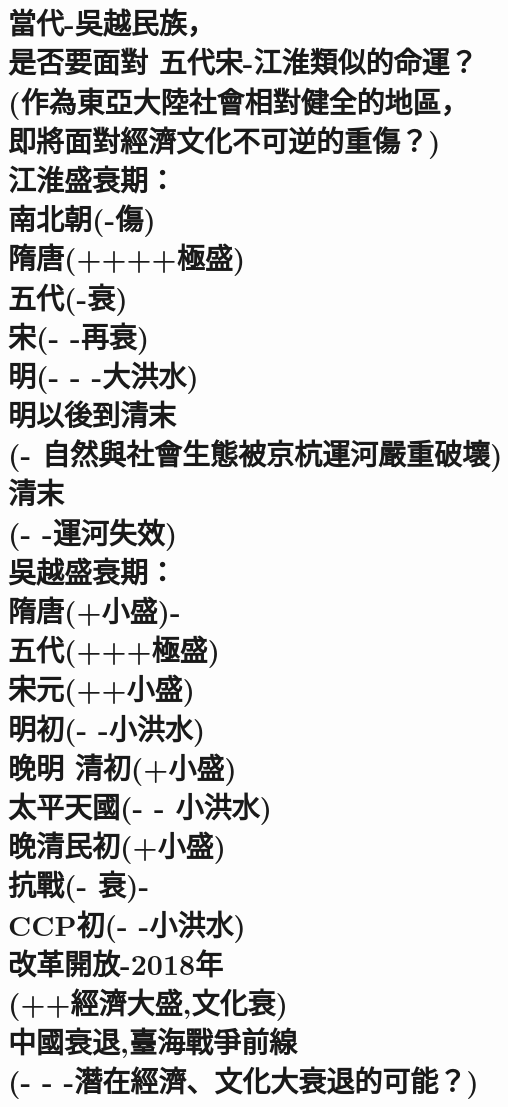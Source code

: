 \chapter[當代-吳越民族， 是否要面對 五代宋-江淮類似的命運？ (作為東亞大陸社會相對健全的地區， 即將面對經濟文化不可逆的重傷？) 江淮盛衰期： 南北朝(-傷) 隋唐(++++極盛) 五代(-衰) 宋(- -再衰) 明(- - -大洪水) 明以後到清末 (- 自然與社會生態被京杭運河嚴重破壞) 清末 (- -運河失效) 吳越盛衰期： 隋唐(+小盛)- 五代(+++極盛) 宋元(++小盛) 明初(- -小洪水) 晚明 清初(+小盛) 太平天國(- - 小洪水) 晚清民初(+小盛) 抗戰(- 衰)- CCP初(- -小洪水) 改革開放-2018年 (++經濟大盛,文化衰) 中國衰退,臺海戰爭前線 (- - -潛在經濟、文化大衰退的可能？)]{當代-吳越民族， \\[0.35em] 是否要面對 五代宋-江淮類似的命運？ \\[0.35em] (作為東亞大陸社會相對健全的地區， \\[0.35em] 即將面對經濟文化不可逆的重傷？) \\[0.35em] 江淮盛衰期： \\[0.35em] 南北朝(-傷) \\[0.35em] 隋唐(++++極盛) \\[0.35em] 五代(-衰) \\[0.35em] 宋(- -再衰) \\[0.35em] 明(- - -大洪水) \\[0.35em] 明以後到清末 \\[0.35em] (- 自然與社會生態被京杭運河嚴重破壞) \\[0.35em] 清末 \\[0.35em] (- -運河失效) \\[0.35em] 吳越盛衰期： \\[0.35em] 隋唐(+小盛)- \\[0.35em] 五代(+++極盛) \\[0.35em] 宋元(++小盛) \\[0.35em] 明初(- -小洪水) \\[0.35em] 晚明 清初(+小盛) \\[0.35em] 太平天國(- - 小洪水) \\[0.35em] 晚清民初(+小盛) \\[0.35em] 抗戰(- 衰)- \\[0.35em] CCP初(- -小洪水) \\[0.35em] 改革開放-2018年 \\[0.35em] (++經濟大盛,文化衰) \\[0.35em] 中國衰退,臺海戰爭前線 \\[0.35em] (- - -潛在經濟、文化大衰退的可能？)}

